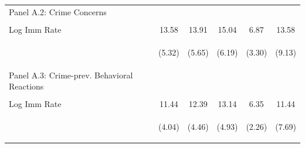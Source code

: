 \begin{center}
\begin{tabular}{lccccc}
\noalign{\smallskip}Panel A.2: Crime Concerns &  &  &  &  & \\
 & \begin{footnotesize}\end{footnotesize} & \begin{footnotesize}\end{footnotesize} & \begin{footnotesize}\end{footnotesize} & \begin{footnotesize}\end{footnotesize} & \begin{footnotesize}\end{footnotesize}\\
\noalign{\smallskip}Log Imm Rate & 13.58 & 13.91 & 15.04 & 6.87 & 13.58\\
 & \begin{footnotesize}(5.32)\end{footnotesize} & \begin{footnotesize}(5.65)\end{footnotesize} & \begin{footnotesize}(6.19)\end{footnotesize} & \begin{footnotesize}(3.30)\end{footnotesize} & \begin{footnotesize}(9.13)\end{footnotesize}\\
\noalign{\smallskip}Panel A.3: Crime-prev. Behavioral Reactions &  &  &  &  & \\
 & \begin{footnotesize}\end{footnotesize} & \begin{footnotesize}\end{footnotesize} & \begin{footnotesize}\end{footnotesize} & \begin{footnotesize}\end{footnotesize} & \begin{footnotesize}\end{footnotesize}\\
\noalign{\smallskip}Log Imm Rate & 11.44 & 12.39 & 13.14 & 6.35 & 11.44\\
 & \begin{footnotesize}(4.04)\end{footnotesize} & \begin{footnotesize}(4.46)\end{footnotesize} & \begin{footnotesize}(4.93)\end{footnotesize} & \begin{footnotesize}(2.26)\end{footnotesize} & \begin{footnotesize}(7.69)\end{footnotesize}\\

\end{tabular}
\end{center}
